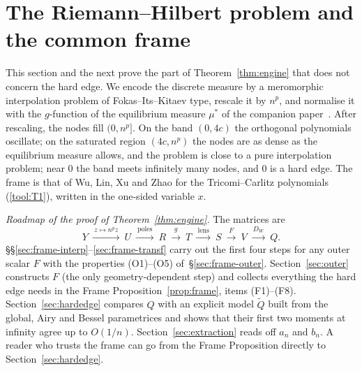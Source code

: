\providecommand{\eps}{\varepsilon}
\providecommand{\Log}{\operatorname{Log}}
\providecommand{\re}{\operatorname{Re}}
\providecommand{\im}{\operatorname{Im}}
\providecommand{\Res}{\operatorname*{Res}}
\providecommand{\thlip}{\vartheta_{\mathrm{lip}}}
\providecommand{\thseam}{\vartheta_{\mathrm{seam}}}
\providecommand{\thw}{\vartheta_{\mathrm{w}}}
\providecommand{\Ob}{\Omega_{\mathrm{b}}}
\providecommand{\Osat}{\Omega^{\triangle}}
\providecommand{\Oinf}{\Omega_{\infty}}
\providecommand{\Sin}{S_{\mathrm{in}}}
\providecommand{\Sout}{S_{\mathrm{out}}}
\providecommand{\Zn}{\mathcal{Z}_n}
\providecommand{\tvphi}{\tilde\varphi}
\providecommand{\Fi}[1]{\textup{(F#1)}}
\providecommand{\Ath}[1]{\textup{(A$_{#1}$)}}
\providecommand{\wn}{\mathsf w_n}

\section{The Riemann--Hilbert problem and the common frame}\label{sec:frame}

This section and the next prove the part of Theorem~\ref{thm:engine} that does not concern the hard edge. We
encode the discrete measure by a meromorphic interpolation problem of Fokas--Its--Kitaev type, rescale it by $n^p$,
and normalise it with the $g$-function of the equilibrium measure $\mu^*$ of the companion paper~\cite{Paper1}. After
rescaling, the nodes fill $(0,n^p]$. On the band $(0,4c)$ the orthogonal polynomials oscillate; on the saturated region
$(4c,n^p)$ the nodes are as dense as the equilibrium measure allows, and the problem is close to a pure interpolation
problem; near $0$ the band meets infinitely many nodes, and $0$ is a hard edge. The frame is that of Wu, Lin, Xu and
Zhao for the Tricomi--Carlitz polynomials (\ref{tool:T1}), written in the one-sided variable $x$.

\emph{Roadmap of the proof of Theorem~\ref{thm:engine}.} The matrices are
\[
  Y\ \xrightarrow{\ z\mapsto n^pz\ }\ U\ \xrightarrow{\ \text{poles}\ }\ R\ \xrightarrow{\ g\ }\ T\
  \xrightarrow{\ \text{lens}\ }\ S\ \xrightarrow{\ F\ }\ V\ \xrightarrow{\ D_W\ }\ Q .
\]
\S\S\ref{sec:frame-interp}--\ref{sec:frame-transf} carry out the first four steps for any outer scalar $F$ with
the properties (O1)--(O5) of~\S\ref{sec:frame-outer}. Section~\ref{sec:outer} constructs $F$ (the only
geometry-dependent step) and collects everything the hard edge needs in the Frame Proposition~\ref{prop:frame}, items
\Fi1--\Fi8. Section~\ref{sec:hardedge} compares $Q$ with an explicit model $\tilde Q$ built from the global, Airy and
Bessel parametrices and shows that their first two moments at infinity agree up to $O(1/n)$.
Section~\ref{sec:extraction} reads off $a_n$ and $b_n$. A reader who trusts the frame can go from the Frame
Proposition directly to Section~\ref{sec:hardedge}.

